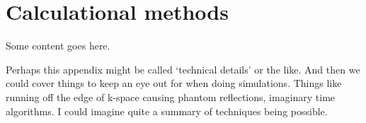 \chapter{Calculational methods}
\label{MethodsAppendix}
\graphicspath{{Figures/MethodsAppendix/}{Figures/Common/}}

Some content goes here.

Perhaps this appendix might be called `technical details' or the like. And then we could cover things to keep an eye out for when doing simulations. Things like running off the edge of k-space causing phantom reflections, imaginary time algorithms. I could imagine quite a summary of techniques being possible.